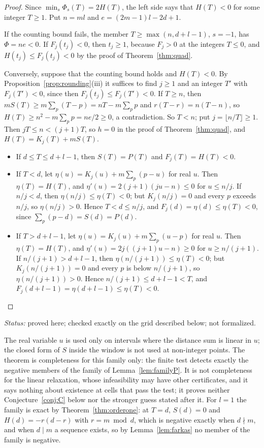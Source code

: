 \documentclass[11pt]{amsart}
\theoremstyle{plain}
\theoremstyle{definition}
\theoremstyle{remark}
\newcommand{\status}[1]{\par\smallskip
  {\small\raggedright\noindent\textit{Status:} #1\par}\smallskip}
\begin{document}
\begin{proof}
Since $\min_s \Phi_s(T) = 2H(T)$, the left side says that $H(T) < 0$ for some integer
$T \ge 1$. Put $n = ml$ and $e = (2m-1)l - 2d + 1$.

If the counting bound fails, the member $T \ge \max(n, d+l-1)$, $s = -1$, has
$\Phi = ne < 0$. If $F_j(t_j) < 0$, then $t_j \ge 1$, because $F_j > 0$ at the integers
$T \le 0$, and $H(t_j) \le F_j(t_j) < 0$ by the proof of Theorem~\ref{thm:quad}.

Conversely, suppose that the counting bound holds and $H(T) < 0$. By
Proposition~\ref{prop:rounding}(iii) it suffices to find $j \ge 1$ and an integer $T'$
with $F_j(T') < 0$, since then $F_j(t_j) \le F_j(T') < 0$. If $T \ge n$, then
$mS(T) \ge m\sum_p (T - p) = nT - m\sum_p p$ and $r(T-r) = n(T - n)$, so
$H(T) \ge n^2 - m\sum_p p = ne/2 \ge 0$, a contradiction. So $T < n$; put
$j = \lfloor n/T \rfloor \ge 1$. Then $jT \le n < (j+1)T$, so $h = 0$ in the proof of
Theorem~\ref{thm:quad}, and $H(T) = K_j(T) + mS(T)$.
\begin{itemize}
\item If $d \le T \le d+l-1$, then $S(T) = P(T)$ and $F_j(T) = H(T) < 0$.
\item If $T < d$, let $\eta(u) = K_j(u) + m\sum_p (p - u)$ for real $u$. Then
  $\eta(T) = H(T)$, and $\eta'(u) = 2(j+1)(ju - n) \le 0$ for $u \le n/j$. If $n/j < d$,
  then $\eta(n/j) \le \eta(T) < 0$; but $K_j(n/j) = 0$ and every $p$ exceeds $n/j$, so
  $\eta(n/j) > 0$. Hence $T < d \le n/j$, and $F_j(d) = \eta(d) \le \eta(T) < 0$, since
  $\sum_p (p - d) = S(d) = P(d)$.
\item If $T > d+l-1$, let $\eta(u) = K_j(u) + m\sum_p (u - p)$ for real $u$. Then
  $\eta(T) = H(T)$, and $\eta'(u) = 2j((j+1)u - n) \ge 0$ for $u \ge n/(j+1)$. If
  $n/(j+1) > d+l-1$, then $\eta(n/(j+1)) \le \eta(T) < 0$; but $K_j(n/(j+1)) = 0$ and
  every $p$ is below $n/(j+1)$, so $\eta(n/(j+1)) > 0$. Hence
  $n/(j+1) \le d+l-1 < T$, and $F_j(d+l-1) = \eta(d+l-1) \le \eta(T) < 0$.\qedhere
\end{itemize}
\end{proof}
\status{proved here; checked exactly on the grid described below; not formalized.}

The real variable $u$ is used only on intervals where the distance sum is linear in
$u$; the closed form of $S$ inside the window is not used at non-integer points. The
theorem is completeness for this family only: the finite test detects exactly the
negative members of the family of Lemma~\ref{lem:familyP}. It is not completeness for
the linear relaxation, whose infeasibility may have other certificates, and it says
nothing about existence at cells that pass the test; it proves neither
Conjecture~\ref{conj:C} below nor the stronger guess stated after it. For $l = 1$ the
family is exact by Theorem~\ref{thm:orderone}: at $T = d$, $S(d) = 0$ and
$H(d) = -r(d-r)$ with $r = m \bmod d$, which is negative exactly when $d \nmid m$, and
when $d \mid m$ a sequence exists, so by Lemma~\ref{lem:farkas} no member of the family
is negative.
\end{document}
